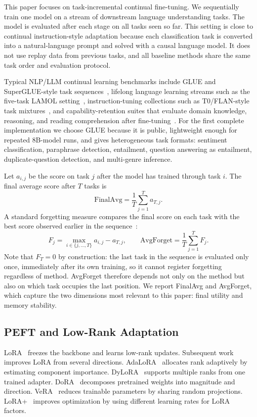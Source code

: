 \documentclass[11pt]{article}
\begin{document}
This paper focuses on task-incremental continual fine-tuning. We sequentially train one model on a stream of downstream language understanding tasks. The model is evaluated after each stage on all tasks seen so far. This setting is close to continual instruction-style adaptation because each classification task is converted into a natural-language prompt and solved with a causal language model. It does not use replay data from previous tasks, and all baseline methods share the same task order and evaluation protocol.

Typical NLP/LLM continual learning benchmarks include GLUE and SuperGLUE-style task sequences~\cite{wang2019glue,wang2019superglue}, lifelong language learning streams such as the five-task LAMOL setting~\cite{sun2019lamol}, instruction-tuning collections such as T0/FLAN-style task mixtures~\cite{scialom2022continualt0}, and capability-retention suites that evaluate domain knowledge, reasoning, and reading comprehension after fine-tuning~\cite{luo2023empiricalforgetting}. For the first complete implementation we choose GLUE because it is public, lightweight enough for repeated 8B-model runs, and gives heterogeneous task formats: sentiment classification, paraphrase detection, entailment, question answering as entailment, duplicate-question detection, and multi-genre inference.

Let $a_{i,j}$ be the score on task $j$ after the model has trained through task $i$. The final average score after $T$ tasks is
\begin{equation}
    \mathrm{FinalAvg} = \frac{1}{T}\sum_{j=1}^{T} a_{T,j}.
\end{equation}
A standard forgetting measure compares the final score on each task with the best score observed earlier in the sequence~\cite{wang2024comprehensivecl}:
\begin{equation}
    F_j = \max_{i\in\{j,\ldots,T\}} a_{i,j} - a_{T,j},
    \qquad
    \mathrm{AvgForget} = \frac{1}{T}\sum_{j=1}^{T} F_j.
    \label{eq:avgforget}
\end{equation}
Note that $F_T=0$ by construction: the last task in the sequence is evaluated only once, immediately after its own training, so it cannot register forgetting regardless of method. AvgForget therefore depends not only on the method but also on which task occupies the last position.
We report FinalAvg and AvgForget, which capture the two dimensions most relevant to this paper: final utility and memory stability.

\subsection{PEFT and Low-Rank Adaptation}
LoRA~\cite{hu2022lora} freezes the backbone and learns low-rank updates. Subsequent work improves LoRA from several directions. AdaLoRA~\cite{zhang2023adalora} allocates rank adaptively by estimating component importance. DyLoRA~\cite{valipour2023dylora} supports multiple ranks from one trained adapter. DoRA~\cite{liu2024dora} decomposes pretrained weights into magnitude and direction. VeRA~\cite{kopiczko2024vera} reduces trainable parameters by sharing random projections. LoRA+~\cite{hayou2024loraplus} improves optimization by using different learning rates for LoRA factors.
\end{document}
